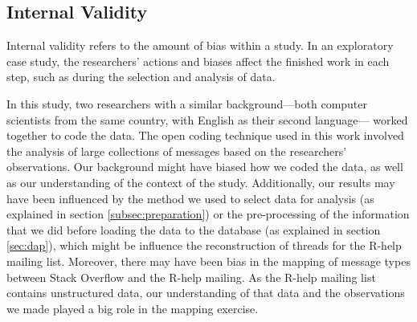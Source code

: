 \documentclass{sig-alternate-05-2015}
\begin{document}
%

\subsection{Internal Validity}

	Internal validity refers to the amount of bias within a study\cite{Creswell2009}. 
	In an exploratory case study, the researchers' actions and biases affect the finished work in each step,  
	such as during the selection and analysis of data. 

	In this study, two researchers with a similar background---both computer scientists from the same country, with English as their second language---	worked together to code the data. 
	The open coding technique used in this work involved the analysis of large collections of messages based on the researchers' observations. 
	Our background might have biased how we coded the data, as well as our understanding of the context of the study. 
	Additionally, our results may have been influenced by the method we used to select data for analysis (as explained in section \ref{subsec:preparation}) or the pre-processing of the information that we did before loading the data to the database (as explained in section \ref{sec:dap}), which might be influence the reconstruction of threads for the R-help mailing list. 
	Moreover, there may have been bias in the mapping of message types between Stack Overflow and the R-help mailing. As the R-help mailing list contains unstructured data, our understanding of that data and the observations we made played a big role in the mapping exercise. 
\end{document}
